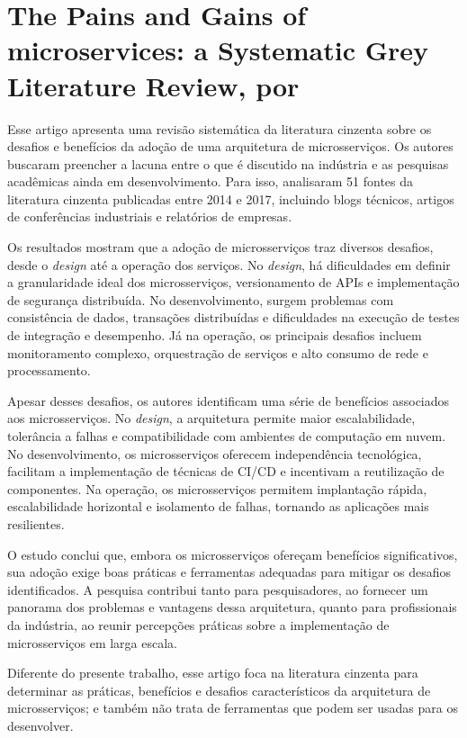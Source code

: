 \section{The Pains and Gains of microservices: a Systematic Grey Literature Review, por \texorpdfstring{}{Soldani, Tamburri e Heuvel (2018)}}
Esse artigo apresenta uma revisão sistemática da literatura cinzenta sobre os desafios e benefícios da adoção de uma arquitetura de microsserviços. Os autores buscaram preencher a lacuna entre o que é discutido na indústria e as pesquisas acadêmicas ainda em desenvolvimento. Para isso, analisaram 51 fontes da literatura cinzenta publicadas entre 2014 e 2017, incluindo blogs técnicos, artigos de conferências industriais e relatórios de empresas.

Os resultados mostram que a adoção de microsserviços traz diversos desafios, desde o \emph{design} até a operação dos serviços. No \emph{design}, há dificuldades em definir a granularidade ideal dos microsserviços, versionamento de APIs e implementação de segurança distribuída. No desenvolvimento, surgem problemas com consistência de dados, transações distribuídas e dificuldades na execução de testes de integração e desempenho. Já na operação, os principais desafios incluem monitoramento complexo, orquestração de serviços e alto consumo de rede e processamento.

Apesar desses desafios, os autores identificam uma série de benefícios associados aos microsserviços. No \emph{design}, a arquitetura permite maior escalabilidade, tolerância a falhas e compatibilidade com ambientes de computação em nuvem. No desenvolvimento, os microsserviços oferecem independência tecnológica, facilitam a implementação de técnicas de CI/CD e incentivam a reutilização de componentes. Na operação, os microsserviços permitem implantação rápida, escalabilidade horizontal e isolamento de falhas, tornando as aplicações mais resilientes.

O estudo conclui que, embora os microsserviços ofereçam benefícios significativos, sua adoção exige boas práticas e ferramentas adequadas para mitigar os desafios identificados. A pesquisa contribui tanto para pesquisadores, ao fornecer um panorama dos problemas e vantagens dessa arquitetura, quanto para profissionais da indústria, ao reunir percepções práticas sobre a implementação de microsserviços em larga escala.

Diferente do presente trabalho, esse artigo foca na literatura cinzenta para determinar as práticas, benefícios e desafios característicos da arquitetura de microsserviços; e também não trata de ferramentas que podem ser usadas para os desenvolver.

